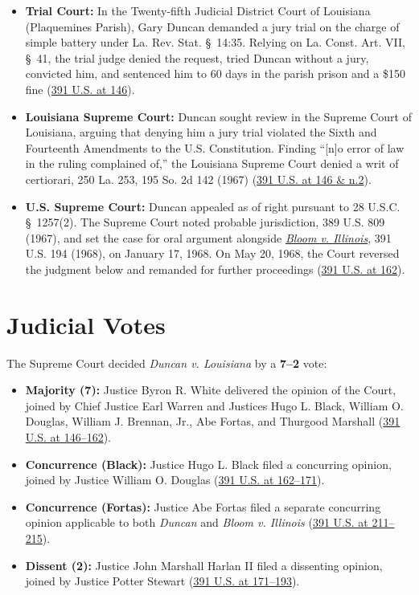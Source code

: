 \documentclass[12pt]{article}
\begin{document}
\begin{itemize}
  \item \textbf{Trial Court:} In the Twenty-fifth Judicial District Court of Louisiana (Plaquemines Parish), Gary Duncan demanded a jury trial on the charge of simple battery under La. Rev. Stat. \S~14:35. Relying on La. Const. Art. VII, \S~41, the trial judge denied the request, tried Duncan without a jury, convicted him, and sentenced him to 60 days in the parish prison and a \$150 fine (\href{https://caselaw.findlaw.com/court/us-supreme-court/391/145.html}{391 U.S. at 146}).
  \item \textbf{Louisiana Supreme Court:} Duncan sought review in the Supreme Court of Louisiana, arguing that denying him a jury trial violated the Sixth and Fourteenth Amendments to the U.S. Constitution. Finding ``[n]o error of law in the ruling complained of,'' the Louisiana Supreme Court denied a writ of certiorari, 250 La. 253, 195 So. 2d 142 (1967) (\href{https://supreme.justia.com/cases/federal/us/391/145/}{391 U.S. at 146 \& n.2}).
  \item \textbf{U.S. Supreme Court:} Duncan appealed as of right pursuant to 28 U.S.C. \S~1257(2). The Supreme Court noted probable jurisdiction, 389 U.S. 809 (1967), and set the case for oral argument alongside \href{https://supreme.justia.com/cases/federal/us/391/194/}{\textit{Bloom v. Illinois}}, 391 U.S. 194 (1968), on January 17, 1968. On May 20, 1968, the Court reversed the judgment below and remanded for further proceedings (\href{https://www.courtlistener.com/opinion/107685/duncan-v-louisiana/}{391 U.S. at 162}).
\end{itemize}

\section{Judicial Votes}

The Supreme Court decided \textit{Duncan v. Louisiana} by a \textbf{7--2} vote:

\begin{itemize}
  \item \textbf{Majority (7):} Justice Byron R. White delivered the opinion of the Court, joined by Chief Justice Earl Warren and Justices Hugo L. Black, William O. Douglas, William J. Brennan, Jr., Abe Fortas, and Thurgood Marshall (\href{https://supreme.justia.com/cases/federal/us/391/145/}{391 U.S. at 146--162}).
  \item \textbf{Concurrence (Black):} Justice Hugo L. Black filed a concurring opinion, joined by Justice William O. Douglas (\href{https://supreme.justia.com/cases/federal/us/391/145/}{391 U.S. at 162--171}).
  \item \textbf{Concurrence (Fortas):} Justice Abe Fortas filed a separate concurring opinion applicable to both \textit{Duncan} and \textit{Bloom v. Illinois} (\href{https://supreme.justia.com/cases/federal/us/391/194/}{391 U.S. at 211--215}).
  \item \textbf{Dissent (2):} Justice John Marshall Harlan II filed a dissenting opinion, joined by Justice Potter Stewart (\href{https://supreme.justia.com/cases/federal/us/391/145/}{391 U.S. at 171--193}).
\end{itemize}
\end{document}
